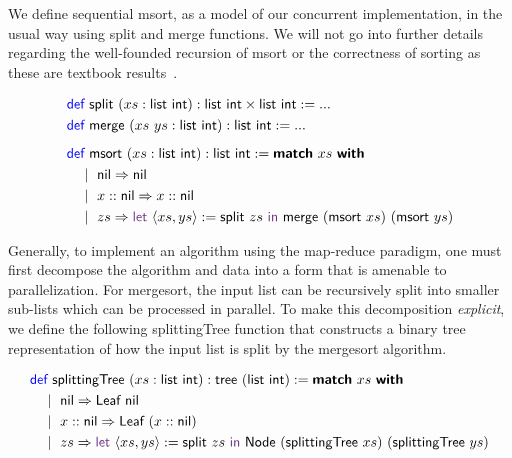 We define sequential \textsf{msort}, as a model of our concurrent implementation,
in the usual way using \textsf{split} and \textsf{merge} functions.
We will not go into further details regarding the well-founded recursion
of \textsf{msort} or the correctness of sorting as these are textbook results~\cite{cpdt}.

\vspace{-1em}
\begingroup
\small
\addtolength{\jot}{-0.2em}
\begin{align*}
  &\Def\ \textsf{split}\ (xs : \textsf{list}\ \textsf{int}) : \textsf{list}\ \textsf{int} \times \textsf{list}\ \textsf{int} := ... \\
  &\Def\ \textsf{merge}\ (xs\ ys : \textsf{list}\ \textsf{int}) : \textsf{list}\ \textsf{int} := ...
  \\[0.5em]
  &\Def\ \textsf{msort}\ (xs : \textsf{list}\ \textsf{int}) : \textsf{list}\ \textsf{int} := \Match\ xs\ \With \\
  &\quad\mid\ \textsf{nil} \Rightarrow \textsf{nil} \\
  &\quad\mid\ x :: \textsf{nil} \Rightarrow x :: \textsf{nil} \\
  &\quad\mid\ zs \Rightarrow \Let\ \langle{xs, ys}\rangle := \textsf{split}\ zs\ \In\ \textsf{merge}\ (\textsf{msort}\ xs)\ (\textsf{msort}\ ys)
\end{align*}
\endgroup

Generally, to implement an algorithm using the map-reduce paradigm, one must first 
decompose the algorithm and data into a form that is amenable to parallelization. 
For mergesort, the input list can be recursively split into smaller sub-lists
which can be processed in parallel. To make this decomposition \emph{explicit},
we define the following \textsf{splittingTree} function that constructs a binary tree
representation of how the input list is split by the mergesort algorithm.

\vspace{-1em}
\begingroup
\small
\addtolength{\jot}{-0.2em}
\begin{align*}
  &\Def\ \textsf{splittingTree}\ (xs : \textsf{list}\ \textsf{int}) : \textsf{tree}\ (\textsf{list}\ \textsf{int}) := \Match\ xs\ \With \\
  &\quad\mid\ \textsf{nil} \Rightarrow \textsf{Leaf}\ \textsf{nil} \\
  &\quad\mid\ x :: \textsf{nil} \Rightarrow \textsf{Leaf}\ (x :: \textsf{nil}) \\
  &\quad\mid\ zs \Rightarrow \Let\ \langle{xs, ys}\rangle := \textsf{split}\ zs\ \In\ \textsf{Node}\ (\textsf{splittingTree}\ xs)\ (\textsf{splittingTree}\ ys)
\end{align*}
\endgroup

